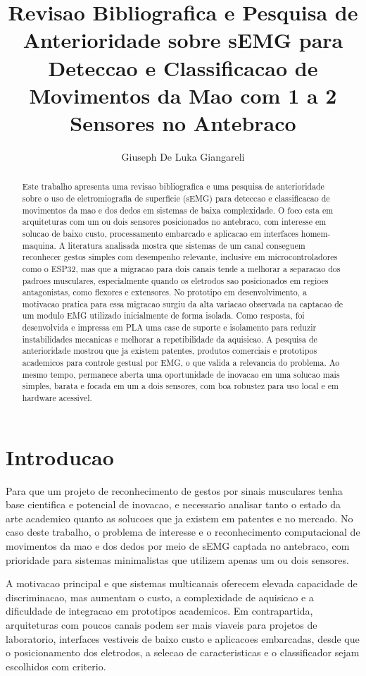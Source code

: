 \documentclass[12pt,oneside,a4paper,english,brazilian]{abntex2}
\title{Revisao Bibliografica e Pesquisa de Anterioridade sobre sEMG para Deteccao e Classificacao de Movimentos da Mao com 1 a 2 Sensores no Antebraco}
\author{Giuseph De Luka Giangareli}
\date{}
\begin{document}
\maketitle

\begin{abstract}
Este trabalho apresenta uma revisao bibliografica e uma pesquisa de anterioridade sobre o uso de eletromiografia de superficie (sEMG) para deteccao e classificacao de movimentos da mao e dos dedos em sistemas de baixa complexidade. O foco esta em arquiteturas com um ou dois sensores posicionados no antebraco, com interesse em solucao de baixo custo, processamento embarcado e aplicacao em interfaces homem-maquina. A literatura analisada mostra que sistemas de um canal conseguem reconhecer gestos simples com desempenho relevante, inclusive em microcontroladores como o ESP32, mas que a migracao para dois canais tende a melhorar a separacao dos padroes musculares, especialmente quando os eletrodos sao posicionados em regioes antagonistas, como flexores e extensores. No prototipo em desenvolvimento, a motivacao pratica para essa migracao surgiu da alta variacao observada na captacao de um modulo EMG utilizado inicialmente de forma isolada. Como resposta, foi desenvolvida e impressa em PLA uma case de suporte e isolamento para reduzir instabilidades mecanicas e melhorar a repetibilidade da aquisicao. A pesquisa de anterioridade mostrou que ja existem patentes, produtos comerciais e prototipos academicos para controle gestual por EMG, o que valida a relevancia do problema. Ao mesmo tempo, permanece aberta uma oportunidade de inovacao em uma solucao mais simples, barata e focada em um a dois sensores, com boa robustez para uso local e em hardware acessivel.
\end{abstract}

\section{Introducao}

Para que um projeto de reconhecimento de gestos por sinais musculares tenha base cientifica e potencial de inovacao, e necessario analisar tanto o estado da arte academico quanto as solucoes que ja existem em patentes e no mercado. No caso deste trabalho, o problema de interesse e o reconhecimento computacional de movimentos da mao e dos dedos por meio de sEMG captada no antebraco, com prioridade para sistemas minimalistas que utilizem apenas um ou dois sensores.

A motivacao principal e que sistemas multicanais oferecem elevada capacidade de discriminacao, mas aumentam o custo, a complexidade de aquisicao e a dificuldade de integracao em prototipos academicos. Em contrapartida, arquiteturas com poucos canais podem ser mais viaveis para projetos de laboratorio, interfaces vestiveis de baixo custo e aplicacoes embarcadas, desde que o posicionamento dos eletrodos, a selecao de caracteristicas e o classificador sejam escolhidos com criterio.
\end{document}
